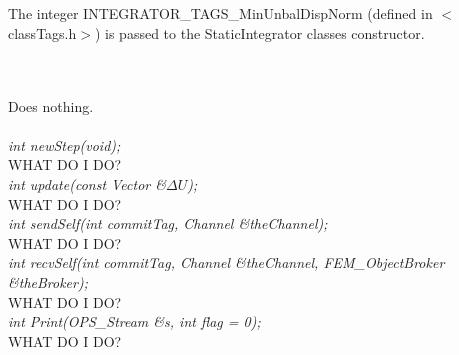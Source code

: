 \\
\\ 
The integer INTEGRATOR\_TAGS\_MinUnbalDispNorm (defined in
$<$classTags.h$>$) is passed to the StaticIntegrator classes
constructor. 


 \\
\\ 
Does nothing. \\

\\

{\em int newStep(void);} \\
WHAT DO I DO?\\

{\em int update(const Vector \&$\Delta U$);} \\
WHAT DO I DO?\\

{\em int sendSelf(int commitTag, Channel \&theChannel); } \\ 
WHAT DO I DO?\\

{\em int recvSelf(int commitTag, Channel \&theChannel, 
FEM\_ObjectBroker \&theBroker); } \\ 
WHAT DO I DO?\\

{\em int Print(OPS\_Stream \&s, int flag = 0);}\\
WHAT DO I DO?